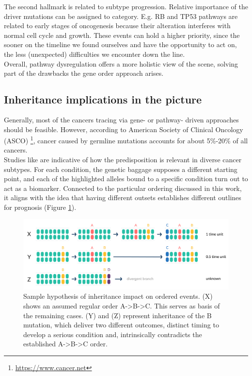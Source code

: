 The second hallmark is related to subtype progression. Relative importance of the driver mutations can be assigned to category. E.g. RB and TP53 pathways are related to early stages of oncogenesis because their alteration interferes with normal cell cycle and growth. These events can hold a higher priority, since the sooner on the timeline we found ourselves and have the opportunity to act on, the less (unexpected) difficulties we encounter down the line.
\\

Overall, pathway dysregulation offers a more holistic view of the scene, solving part of the drawbacks the gene order approach arises.

\subsection{Inheritance implications in the picture}
Generally, most of the cancers tracing via gene- or pathway- driven approaches should be feasible. However, according to American Society of Clinical Oncology (ASCO) \footnote{\url{https://www.cancer.net}}, cancer caused by germline mutations accounts for about 5\%-20\% of all cancers.
\\

Studies like \cite{DeLaChapelle2004GeneticCancer} are indicative of how the predisposition is relevant in diverse cancer subtypes. For each condition, the genetic baggage supposes a different starting point, and each of the highlighted alleles bound to a specific condition turn out to act as a biomarker. Connected to the particular ordering discussed in this work, it aligns with the idea that having different outsets establishes different outlines for prognosis (Figure \ref{fig:inh}).
\\

\begin{figure}
    \centering
    \includegraphics[width=\linewidth]{images/InH.png}
    \caption{Sample hypothesis of inheritance impact on ordered events. (X) shows an assumed regular order A->B->C. This serves as basis of the remaining cases. (Y) and (Z) represent inheritance of the B mutation, which deliver two different outcomes, distinct timing to develop a serious condition and, intrinsically contradicts the established A->B->C order.}
    \label{fig:inh}
\end{figure}

